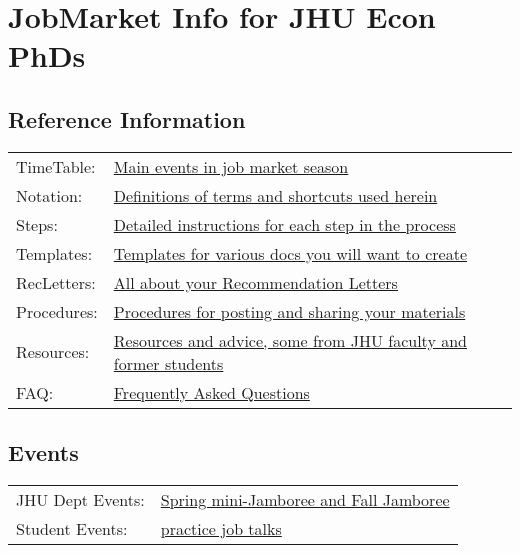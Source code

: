 \documentclass{\econtex}
\begin{document}
\medskip


\section*{JobMarket Info for JHU Econ PhDs}
\subsection*{Reference Information}

\medskip

\begin{tabular}{ll}
  TimeTable: & \href{\pageurl/TimeTable}{Main events in job market season} \\
  Notation: & \href{\pageurl/Notation}{Definitions of terms and shortcuts used herein} \\
  Steps: & \href{\pageurl/Steps}{Detailed instructions for each step in the process} \\
  Templates: & \href{\bloburl/Templates}{Templates for various docs you will want to create} \\
  RecLetters: & \href{\pageurl/RecLetters}{All about your Recommendation Letters} \\
  Procedures: & \href{\bloburl/JobMarketProceduresHelp.md}{Procedures for posting and sharing your materials} \\
  Resources: & \href{\bloburl/Resources}{Resources and advice, some from JHU faculty and former students} \\
  FAQ: & \href{\pageurl/FAQ}{Frequently Asked Questions} \\
\end{tabular}

\medskip

\subsection*{Events}
\begin{tabular}{ll}
  JHU Dept Events: & \href{\pageurl/Jamborees}{Spring mini-Jamboree and Fall Jamboree} \\
  Student Events: &  \href{https://jh.hosted.panopto.com/Panopto/Pages/Sessions/List.aspx?folderID=4a25e803-cd94-4e31-b350-b00500e50267}{practice job talks}
\end{tabular}
\end{document}
